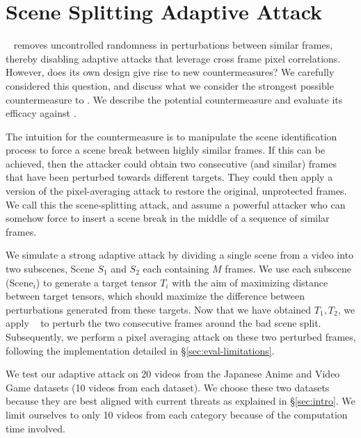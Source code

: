 
\section{Scene Splitting Adaptive Attack}
\label{sec:counter}

\system~ removes uncontrolled randomness in perturbations between similar
frames, thereby disabling adaptive attacks that leverage cross frame pixel
correlations. However, does its own design give rise to new countermeasures?
We carefully considered this question, and discuss what we consider the
strongest possible countermeasure to \system{}. We describe the potential
countermeasure and evaluate its efficacy against \system.

The intuition for the countermeasure is to manipulate the scene
identification process to force a scene break between highly similar
frames. If this can be achieved, then the attacker could obtain two
consecutive (and similar) frames that have been perturbed towards different
targets. They could then apply a version of the pixel-averaging attack to
restore the original, unprotected frames. We call this the scene-splitting
attack, and assume a powerful attacker who can somehow force \system{} to
insert a scene break in the middle of a sequence of similar frames.

We simulate a strong adaptive attack by dividing a single scene from a
video into two subscenes, Scene $S_1$ and $S_2$ each containing $M$ frames. We
use each subscene (Scene$_i$) to generate a target tensor $T_{i}$ with the
aim of maximizing distance between target tensors, which should maximize the
difference between perturbations generated from these targets. 
Now that we have obtained $T_1, T_2$, we apply \system~ to perturb the two
consecutive frames around the bad scene split. Subsequently, we perform a
pixel averaging attack on these two perturbed frames, following the
implementation detailed in \S\ref{sec:eval-limitations}. 

We test our adaptive attack on 20 videos from the Japanese Anime and Video
Game datasets (10 videos from each dataset). We choose these two datasets
because they are best aligned with current threats as explained in
\S\ref{sec:intro}. We limit ourselves to only 10 videos from each category
because of the computation time involved.


